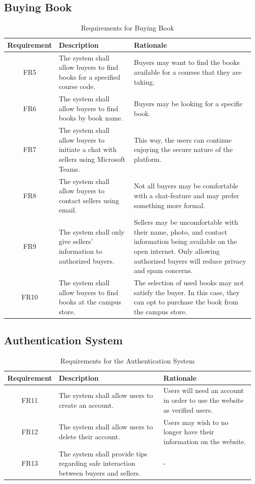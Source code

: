 \documentclass[fullpage]{article}
\begin{document}
\subsection{Buying Book}
\begin{table}[h!]
\flushleft
\begin{tabular}{|c|p{6cm}|p{6cm}|}
\hline
 \rowcolor{lightgray} 
\textbf{Requirement} & \textbf{Description} & \textbf{Rationale} \\
\hline
FR5 &The system shall allow buyers to find books for a specified course code. & Buyers may want to find the books available for a courses that they are taking.\\
\hline
FR6&The system shall allow buyers to find books by book name. & Buyers may be looking for a specific book.\\
\hline
FR7 &The system shall allow buyers to initiate a chat with sellers using Microsoft Teams.
& This way, the users can continue enjoying the secure nature of the platform. \\
\hline
FR8 & The system shall allow buyers to contact sellers using email. & Not all buyers may be comfortable with a chat-feature and may prefer something more formal.\\
\hline
FR9 & The system shall only give sellers' information to authorized buyers. & Sellers may be uncomfortable with their name, photo, and contact information being available on the open internet. Only allowing authorized buyers will reduce privacy and spam concerns.\\
\hline
FR10 & The system shall allow buyers to find books at the campus store. &The selection of used books may not satisfy the buyer. In this case, they can opt to purchase the book from the campus store.\\
\hline
\end{tabular}
\caption{Requirements for Buying Book}
\end{table}

\subsection{Authentication System}
\begin{table}[h!]
\flushleft
\begin{tabular}{|c|p{6cm}|p{6cm}|}
\hline
 \rowcolor{lightgray} 
\textbf{Requirement} & \textbf{Description} & \textbf{Rationale} \\
\hline
FR11 &The system shall allow users to create an account.& Users will need an account in order to use the website as verified users.\\
\hline
FR12&The system shall allow users to delete their account. & Users may wish to no longer have their information on the website.\\
\hline
FR13 & The system shall provide tips regarding safe interaction between buyers and sellers. & -\\
\hline
\end{tabular}
\caption{Requirements for the Authentication System}
\end{table}
\end{document}
